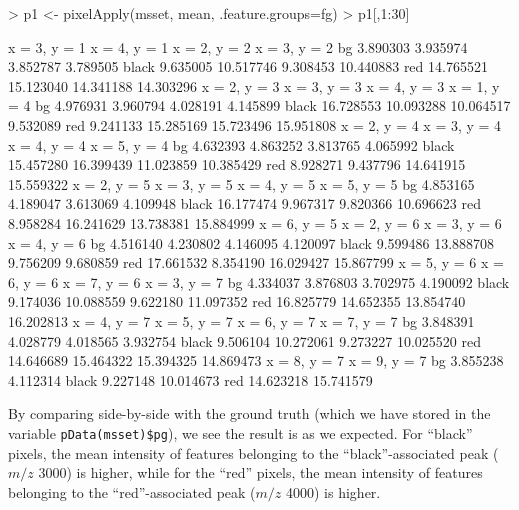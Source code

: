 \documentclass[a4paper]{article}
\begin{document}
\begin{Schunk}
\begin{Sinput}
> p1 <- pixelApply(msset, mean, .feature.groups=fg)
> p1[,1:30]
\end{Sinput}
\begin{Soutput}
      x = 3, y = 1 x = 4, y = 1 x = 2, y = 2 x = 3, y = 2
bg        3.890303     3.935974     3.852787     3.789505
black     9.635005    10.517746     9.308453    10.440883
red      14.765521    15.123040    14.341188    14.303296
      x = 2, y = 3 x = 3, y = 3 x = 4, y = 3 x = 1, y = 4
bg        4.976931     3.960794     4.028191     4.145899
black    16.728553    10.093288    10.064517     9.532089
red       9.241133    15.285169    15.723496    15.951808
      x = 2, y = 4 x = 3, y = 4 x = 4, y = 4 x = 5, y = 4
bg        4.632393     4.863252     3.813765     4.065992
black    15.457280    16.399439    11.023859    10.385429
red       8.928271     9.437796    14.641915    15.559322
      x = 2, y = 5 x = 3, y = 5 x = 4, y = 5 x = 5, y = 5
bg        4.853165     4.189047     3.613069     4.109948
black    16.177474     9.967317     9.820366    10.696623
red       8.958284    16.241629    13.738381    15.884999
      x = 6, y = 5 x = 2, y = 6 x = 3, y = 6 x = 4, y = 6
bg        4.516140     4.230802     4.146095     4.120097
black     9.599486    13.888708     9.756209     9.680859
red      17.661532     8.354190    16.029427    15.867799
      x = 5, y = 6 x = 6, y = 6 x = 7, y = 6 x = 3, y = 7
bg        4.334037     3.876803     3.702975     4.190092
black     9.174036    10.088559     9.622180    11.097352
red      16.825779    14.652355    13.854740    16.202813
      x = 4, y = 7 x = 5, y = 7 x = 6, y = 7 x = 7, y = 7
bg        3.848391     4.028779     4.018565     3.932754
black     9.506104    10.272061     9.273227    10.025520
red      14.646689    15.464322    15.394325    14.869473
      x = 8, y = 7 x = 9, y = 7
bg        3.855238     4.112314
black     9.227148    10.014673
red      14.623218    15.741579
\end{Soutput}
\end{Schunk}
By comparing side-by-side with the ground truth (which we have stored in the variable \verb|pData(msset)$pg|), we see the result is as we expected. For ``black'' pixels, the mean intensity of features belonging to the ``black''-associated peak ($m/z$ 3000) is higher, while for the ``red'' pixels, the mean intensity of features belonging to the ``red''-associated peak ($m/z$ 4000) is higher.
\end{document}

